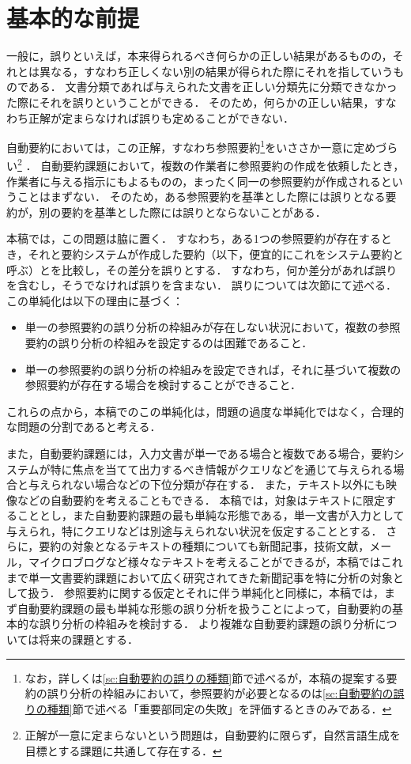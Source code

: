 \section{基本的な前提}
\label{sc:基本的な前提}

一般に，誤りといえば，本来得られるべき何らかの正しい結果があるものの，それとは異なる，すなわち正しくない別の結果が得られた際にそれを指していうものである．
文書分類であれば与えられた文書を正しい分類先に分類できなかった際にそれを誤りということができる．
そのため，何らかの正しい結果，すなわち正解が定まらなければ誤りも定めることができない．

自動要約においては，この正解，すなわち参照要約\footnote{なお，詳しくは\ref{sc:自動要約の誤りの種類}節で述べるが，本稿の提案する要約の誤り分析の枠組みにおいて，参照要約が必要となるのは\ref{sc:自動要約の誤りの種類}節で述べる「重要部同定の失敗」を評価するときのみである．}をいささか一意に定めづらい\footnote{正解が一意に定まらないという問題は，自動要約に限らず，自然言語生成を目標とする課題に共通して存在する．} ．
自動要約課題において，複数の作業者に参照要約の作成を依頼したとき，作業者に与える指示にもよるものの，まったく同一の参照要約が作成されるということはまずない．
そのため，ある参照要約を基準とした際には誤りとなる要約が，別の要約を基準とした際には誤りとならないことがある．

本稿では，この問題は脇に置く．
すなわち，ある1つの参照要約が存在するとき，それと要約システムが作成した要約（以下，便宜的にこれをシステム要約と呼ぶ）とを比較し，その差分を誤りとする．
すなわち，何か差分があれば誤りを含むし，そうでなければ誤りを含まない．
誤りについては次節にて述べる．
この単純化は以下の理由に基づく：

\begin{itemize}
\item
単一の参照要約の誤り分析の枠組みが存在しない状況において，複数の参照要約の誤り分析の枠組みを設定するのは困難であること．
\item
単一の参照要約の誤り分析の枠組みを設定できれば，それに基づいて複数の参照要約が存在する場合を検討することができること．
\end{itemize}

これらの点から，本稿でのこの単純化は，問題の過度な単純化ではなく，合理的な問題の分割であると考える．

また，自動要約課題には，入力文書が単一である場合と複数である場合，要約システムが特に焦点を当てて出力するべき情報がクエリなどを通じて与えられる場合と与えられない場合などの下位分類が存在する．
また，テキスト以外にも映像などの自動要約を考えることもできる．
本稿では，対象はテキストに限定することとし，また自動要約課題の最も単純な形態である，単一文書が入力として与えられ，特にクエリなどは別途与えられない状況を仮定することとする．
さらに，要約の対象となるテキストの種類についても新聞記事\cite{luhn58,aone99}，技術文献\cite{luhn58,edmundson69,pollock75}，メール\cite{muresan01,sandu10}，マイクロブログ\cite{sharifi10,takamura11}など様々なテキストを考えることができるが，本稿ではこれまで単一文書要約課題において広く研究されてきた新聞記事を特に分析の対象として扱う．
参照要約に関する仮定とそれに伴う単純化と同様に，本稿では，まず自動要約課題の最も単純な形態の誤り分析を扱うことによって，自動要約の基本的な誤り分析の枠組みを検討する．
より複雑な自動要約課題の誤り分析については将来の課題とする．

